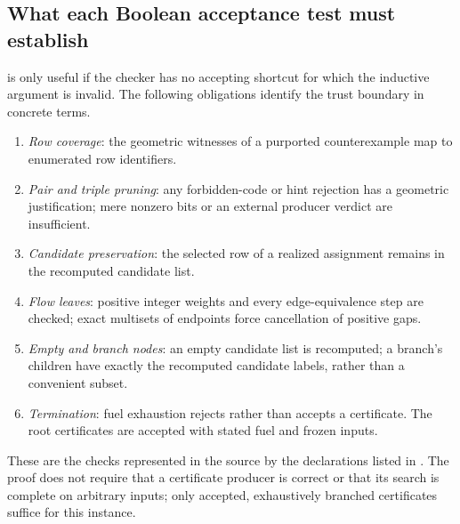 \documentclass[11pt,a4paper]{article}
\theoremstyle{definition}
\begin{document}
\subsection{What each Boolean acceptance test must establish}
 is only useful if the checker has no accepting
shortcut for which the inductive argument is invalid. The
following obligations identify the trust boundary in concrete
terms.\begin{enumerate}[label=(\alph*),leftmargin=*]
\item \emph{Row coverage}: the geometric witnesses of a purported
counterexample map to enumerated row identifiers.
\item \emph{Pair and triple pruning}: any forbidden-code or hint
rejection has a geometric justification; mere nonzero bits or an
external producer verdict are insufficient.
\item \emph{Candidate preservation}: the selected row of a realized
assignment remains in the recomputed candidate list.
\item \emph{Flow leaves}: positive integer weights and every
edge-equivalence step are checked; exact multisets of endpoints
force cancellation of positive gaps.
\item \emph{Empty and branch nodes}: an empty candidate list is
recomputed; a branch's children have exactly the recomputed
candidate labels, rather than a convenient subset.
\item \emph{Termination}: fuel exhaustion rejects rather than
accepts a certificate. The root certificates are accepted with
stated fuel and frozen inputs.
\end{enumerate}
These are the checks represented in the source by the declarations
listed in . The proof does not require that a
certificate producer is correct or that its search is complete on
arbitrary inputs; only accepted, exhaustively branched certificates
suffice for this instance.
\end{document}

